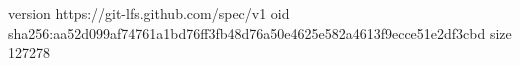 version https://git-lfs.github.com/spec/v1
oid sha256:aa52d099af74761a1bd76ff3fb48d76a50e4625e582a4613f9ecce51e2df3cbd
size 127278
